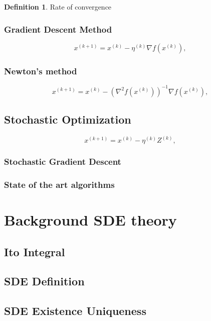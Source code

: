 \documentclass[12pt]{article}
\theoremstyle{definition}
\newtheorem{definition}[theorem]{Definition}
\numberwithin{equation}{section}
\begin{document}
\begin{definition}
  Rate of convergence
\end{definition}
\subsubsection{Gradient Descent Method}
\begin{equation}
  x^{(k+1)} = x^{(k)} - \eta^{(k)} \nabla f(x^{(k)}),
\end{equation}
\subsubsection{Newton's method}
\begin{equation}
  x^{(k+1)} = x^{(k)} - (\nabla^2 f(x^{(k)}))^{-1}\nabla f(x^{(k)}),
\end{equation}
\subsection{Stochastic Optimization}
\label{sec:StochasticOptimization}
\begin{equation}
  x^{(k+1)} = x^{(k)} - \eta^{(k)} Z^{(k)},
\end{equation}
\subsubsection{Stochastic Gradient Descent}

\subsubsection{State of the art algorithms}
\label{sec:StateOfTheArtAlgorithms}

\section{Background SDE theory}
\label{sec:BackgroundSDETheory}
\subsection{Ito Integral}
\label{subsec:ItoIntegral}
\subsection{SDE Definition}
\label{subsec:SDEDefinition}
\subsection{SDE Existence Uniqueness}
\label{subsec:SDEExistenceUniqueness}
\end{document}
